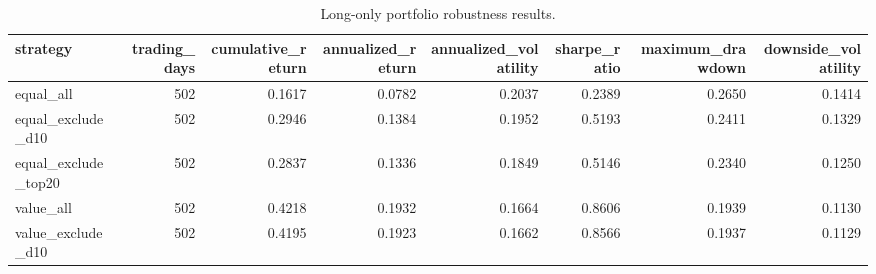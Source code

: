 \begin{table}
\caption{Long-only portfolio robustness results.}
\label{tab:portfolio-robustness-performance}
\begin{tabular}{lrrrrrrr}
\toprule
strategy & trading_days & cumulative_return & annualized_return & annualized_volatility & sharpe_ratio & maximum_drawdown & downside_volatility \\
\midrule
equal_all & 502 & 0.1617 & 0.0782 & 0.2037 & 0.2389 & 0.2650 & 0.1414 \\
equal_exclude_d10 & 502 & 0.2946 & 0.1384 & 0.1952 & 0.5193 & 0.2411 & 0.1329 \\
equal_exclude_top20 & 502 & 0.2837 & 0.1336 & 0.1849 & 0.5146 & 0.2340 & 0.1250 \\
value_all & 502 & 0.4218 & 0.1932 & 0.1664 & 0.8606 & 0.1939 & 0.1130 \\
value_exclude_d10 & 502 & 0.4195 & 0.1923 & 0.1662 & 0.8566 & 0.1937 & 0.1129 \\
\bottomrule
\end{tabular}
\end{table}
